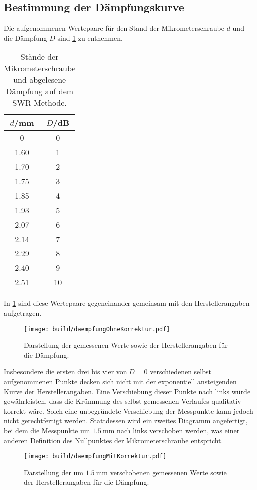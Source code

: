 \subsection{Bestimmung der Dämpfungskurve}
\label{subsec:auswertungdämpfung}

Die aufgenommenen Wertepaare für den Stand der Mikrometerschraube $d$ und die Dämpfung $D$ sind \ref{tab:daempfung} zu entnehmen.

\begin{table}
\centering
\caption{Stände der Mikrometerschraube und abgelesene Dämpfung auf dem SWR-Methode.}
\label{tab:daempfung}
\begin{tabular}{c c}
\toprule
$d$/mm & $D$/dB \\
\midrule
  0    &  0 \tabularnewline
  1.60 &  1 \tabularnewline
  1.70 &  2 \tabularnewline
  1.75 &  3 \tabularnewline
  1.85 &  4 \tabularnewline
  1.93 &  5 \tabularnewline
  2.07 &  6 \tabularnewline
  2.14 &  7 \tabularnewline
  2.29 &  8 \tabularnewline
  2.40 &  9 \tabularnewline
  2.51 & 10 \tabularnewline
\bottomrule
\end{tabular}
\end{table}

In \ref{fig:daempfungOhneKorrektur} sind diese Wertepaare gegeneinander gemeinsam mit den Herstellerangaben aufgetragen.

\begin{figure}
  \centering
  \texttt{[image: build/daempfungOhneKorrektur.pdf]}
  \caption{Darstellung der gemessenen Werte sowie der Herstellerangaben für die Dämpfung.}
  \label{fig:daempfungOhneKorrektur}
\end{figure}

Insbesondere die ersten drei bis vier von $D=0$ verschiedenen selbst aufgenommenen Punkte decken sich nicht mit der exponentiell ansteigenden Kurve der Herstellerangaben. Eine Verschiebung dieser Punkte nach links würde gewährleisten, dass die Krümmung des selbst gemessenen Verlaufes qualitativ korrekt wäre. Solch eine unbegründete Verschiebung der Messpunkte kann jedoch nicht gerechtfertigt werden. Stattdessen wird ein zweites Diagramm angefertigt, bei dem die Messpunkte um $\SI{1.5}{\milli\meter}$ nach links verschoben werden, was einer anderen Definition des Nullpunktes der Mikrometerschraube entspricht.

\begin{figure}
  \centering
  \texttt{[image: build/daempfungMitKorrektur.pdf]}
  \caption{Darstellung der um $\SI{1.5}{\milli\meter}$ verschobenen gemessenen Werte sowie der Herstellerangaben für die Dämpfung.}
  \label{fig:daempfungMitKorrektur}
\end{figure}

